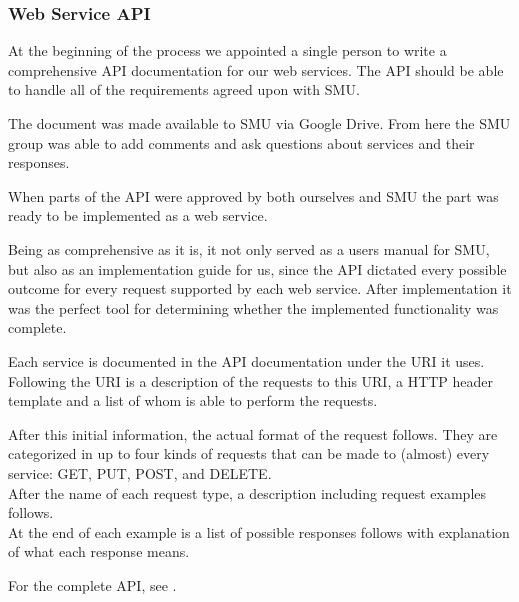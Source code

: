 \subsubsection{Web Service API}
At the beginning of the process we appointed a single person to write a comprehensive API documentation for our web services.
The API should be able to handle all of the requirements agreed  upon with SMU.

The document was made available to SMU via Google Drive. From here the SMU group was able to add comments and ask questions about services and their responses.

When parts of the API were approved by both ourselves and SMU the part was ready to be implemented as a web service.

Being as comprehensive as it is, it not only served as a users manual for SMU, but also as an implementation guide for us, since the API dictated every possible outcome for every request supported by each web service. After implementation it was the perfect tool for determining whether the implemented functionality was complete.

Each service is documented in the API documentation under the URI it uses. Following the URI is a description of the requests to this URI, a HTTP header template and a list of whom is able to perform the requests.

After this initial information, the actual format of the request follows. They are categorized in up to four kinds of requests that can be made to (almost) every service: GET, PUT, POST, and DELETE. \\
After the name of each request type, a description including request examples follows. \\
At the end of each example is a list of possible responses follows with explanation of what each response means.

For the complete API, see .